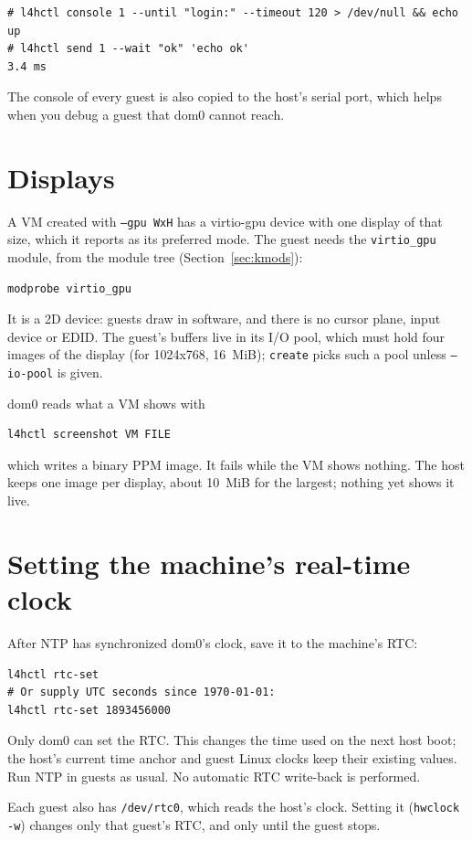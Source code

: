 \documentclass[11pt,a4paper]{report}
\newcommand{\cmd}[1]{\texttt{#1}}
\begin{document}
\begin{lstlisting}
# l4hctl console 1 --until "login:" --timeout 120 > /dev/null && echo up
# l4hctl send 1 --wait "ok" 'echo ok'
3.4 ms
\end{lstlisting}

The console of every guest is also copied to the host's serial port, which
helps when you debug a guest that dom0 cannot reach.

\section{Displays}
\label{sec:display}

A VM created with \texttt{--gpu WxH} has a virtio-gpu device with one
display of that size, which it reports as its preferred mode. The guest
needs the \texttt{virtio\_gpu} module, from the module tree
(Section~\ref{sec:kmods}):
\begin{lstlisting}
modprobe virtio_gpu
\end{lstlisting}
It is a 2D device: guests draw in software, and there is no cursor plane,
input device or EDID. The guest's buffers live in its I/O pool, which
must hold four images of the display (for 1024x768, 16~MiB);
\cmd{create} picks such a pool unless \texttt{--io-pool} is given.

dom0 reads what a VM shows with
\begin{lstlisting}
l4hctl screenshot VM FILE
\end{lstlisting}
which writes a binary PPM image. It fails while the VM shows nothing. The
host keeps one image per display, about 10~MiB for the largest; nothing
yet shows it live.

\section{Setting the machine's real-time clock}

After NTP has synchronized dom0's clock, save it to the machine's RTC:
\begin{lstlisting}
l4hctl rtc-set
# Or supply UTC seconds since 1970-01-01:
l4hctl rtc-set 1893456000
\end{lstlisting}

Only dom0 can set the RTC. This changes the time used on the next host
boot; the host's current time anchor and guest Linux clocks keep their
existing values. Run NTP in guests as usual. No automatic RTC write-back
is performed.

Each guest also has \texttt{/dev/rtc0}, which reads the host's clock.
Setting it (\texttt{hwclock -w}) changes only that guest's RTC, and only
until the guest stops.
\end{document}
